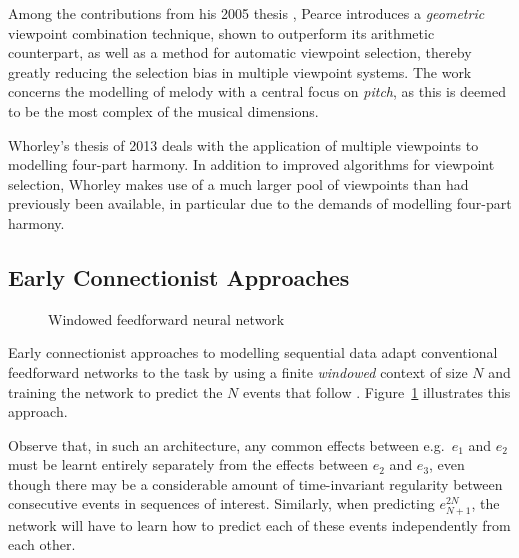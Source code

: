 \documentclass[12pt,a4paper,twoside,openright]{report}
\newcommand{\vect}[1]{\boldsymbol{\mathbf{#1}}}
\begin{document}
Among the contributions from his 2005 thesis \cite{pearce2005construction},
Pearce introduces a \emph{geometric} viewpoint combination technique, shown to
outperform its arithmetic counterpart, as well as a method for automatic
viewpoint selection, thereby greatly reducing the selection bias in multiple
viewpoint systems. The work concerns the modelling of melody with a central
focus on \emph{pitch}, as this is deemed to be the most complex of the musical
dimensions.

Whorley's thesis of 2013 \cite{whorley2013phd} deals with the application of
multiple viewpoints to modelling four-part harmony. In addition to improved
algorithms for viewpoint selection, Whorley makes use of a much larger pool of
viewpoints than had previously been available, in particular due to the demands
of modelling four-part harmony.

\subsection{Early Connectionist Approaches}

\begin{figure}[H]
\centering
\caption{Windowed feedforward neural network}
\label{fig:windowed-nn}
\end{figure}

Early connectionist approaches to modelling sequential data adapt conventional
feedforward networks to the task by using a finite \emph{windowed} context of
size $N$ and training the network to predict the $N$ events that follow
\cite{todd1989connectionist}. Figure~\ref{fig:windowed-nn} illustrates this
approach.

Observe that, in such an architecture, any common effects between e.g.\ $e_1$
and $e_2$ must be learnt entirely separately from the effects between $e_2$ and
$e_3$, even though there may be a considerable amount of time-invariant
regularity between consecutive events in sequences of interest. Similarly, when
predicting $e_{N+1}^{2N}$, the network will have to learn how to predict each of
these events independently from each other.  
\end{document}
